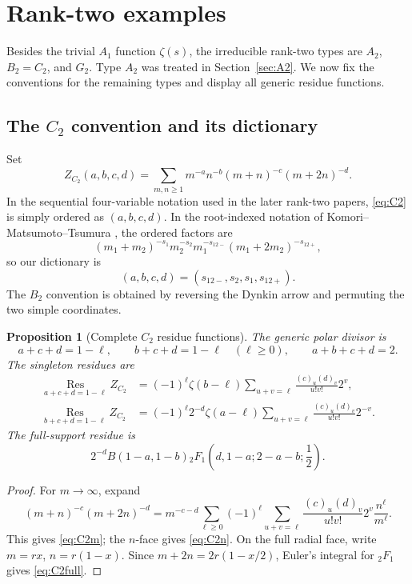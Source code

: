 \documentclass[11pt]{article}
\newtheorem{proposition}[theorem]{Proposition}
\renewcommand{\boxed}[1]{#1}
\newcommand{\Res}{\operatorname*{Res}}
\begin{document}
\section{Rank-two examples}

Besides the trivial \(A_1\) function \(\zeta(s)\), the irreducible
rank-two types are \(A_2\), \(B_2=C_2\), and \(G_2\).  Type \(A_2\)
was treated in Section~\ref{sec:A2}.  We now fix the conventions for the remaining
types and display all generic residue functions.

\subsection{The \texorpdfstring{\(C_2\)}{C2} convention and its dictionary}

Set
\begin{equation}\label{eq:C2}
 Z_{C_2}(a,b,c,d)=
 \sum_{m,n\ge1}m^{-a}n^{-b}(m+n)^{-c}(m+2n)^{-d}.
\end{equation}
In the sequential four-variable notation used in the later rank-two
papers, \eqref{eq:C2} is simply ordered as $(a,b,c,d)$.  In the
root-indexed notation of Komori--Matsumoto--Tsumura
\cite{KMT2010II}, the ordered factors are
\[
 (m_1+m_2)^{-s_1}m_2^{-s_2}m_1^{-s_{12-}}
 (m_1+2m_2)^{-s_{12+}},
\]
so our dictionary is
\[
 \boxed{
 (a,b,c,d)=(s_{12-},s_2,s_1,s_{12+}).}
\]
The \(B_2\) convention is obtained by reversing the Dynkin arrow and
permuting the two simple coordinates.

\begin{proposition}[Complete \(C_2\) residue functions]\label{prop:C2}
The generic polar divisor is
\[
 a+c+d=1-\ell,\qquad
 b+c+d=1-\ell\quad(\ell\ge0),\qquad
 a+b+c+d=2.
\]
The singleton residues are
\begin{align}
 \Res_{a+c+d=1-\ell}Z_{C_2}
 &=(-1)^\ell\zeta(b-\ell)
 \sum_{u+v=\ell}
 \frac{(c)_u(d)_v}{u!v!}2^v,
 \label{eq:C2m}\\
 \Res_{b+c+d=1-\ell}Z_{C_2}
 &=(-1)^\ell2^{-d}\zeta(a-\ell)
 \sum_{u+v=\ell}
 \frac{(c)_u(d)_v}{u!v!}2^{-v}.
 \label{eq:C2n}
\end{align}
The full-support residue is
\begin{equation}\label{eq:C2full}
 \boxed{
 2^{-d}B(1-a,1-b)
 {}_2F_1\!\left(d,1-a;2-a-b;\frac12\right).}
\end{equation}
\end{proposition}

\begin{proof}
For \(m\to\infty\), expand
\[
 (m+n)^{-c}(m+2n)^{-d}
 =
 m^{-c-d}
 \sum_{\ell\ge0}(-1)^\ell
 \sum_{u+v=\ell}
 \frac{(c)_u(d)_v}{u!v!}2^v
 \frac{n^\ell}{m^\ell}.
\]
This gives \eqref{eq:C2m}; the \(n\)-face gives
\eqref{eq:C2n}.  On the full radial face, write \(m=r x\),
\(n=r(1-x)\).  Since \(m+2n=2r(1-x/2)\), Euler's integral for
\({}_2F_1\) gives \eqref{eq:C2full}.
\end{proof}
\end{document}
